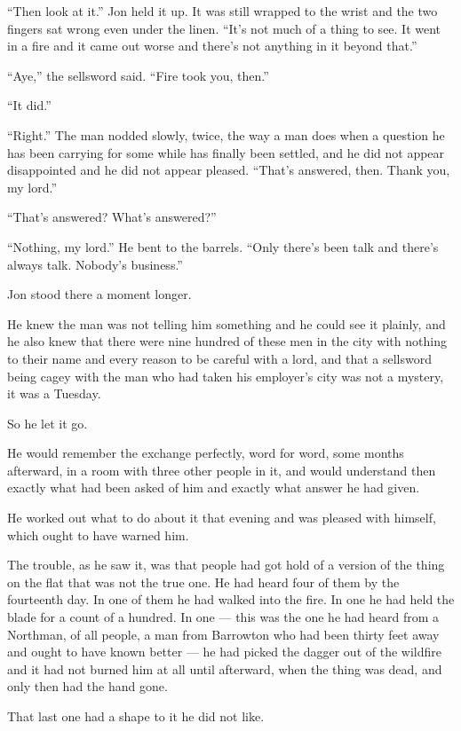 “Then look at it.” Jon held it up. It was still wrapped to the wrist and the two fingers sat wrong even under the linen. “It’s not much of a thing to see. It went in a fire and it came out worse and there’s not anything in it beyond that.”

“Aye,” the sellsword said. “Fire took you, then.”

“It did.”

“Right.” The man nodded slowly, twice, the way a man does when a question he has been carrying for some while has finally been settled, and he did not appear disappointed and he did not appear pleased. “That’s answered, then. Thank you, my lord.”

“That’s answered? What’s answered?”

“Nothing, my lord.” He bent to the barrels. “Only there’s been talk and there’s always talk. Nobody’s business.”

Jon stood there a moment longer.

He knew the man was not telling him something and he could see it plainly, and he also knew that there were nine hundred of these men in the city with nothing to their name and every reason to be careful with a lord, and that a sellsword being cagey with the man who had taken his employer’s city was not a mystery, it was a Tuesday.

So he let it go.

He would remember the exchange perfectly, word for word, some months afterward, in a room with three other people in it, and would understand then exactly what had been asked of him and exactly what answer he had given.

\sceneBreak

He worked out what to do about it that evening and was pleased with himself, which ought to have warned him.

The trouble, as he saw it, was that people had got hold of a version of the thing on the flat that was not the true one. He had heard four of them by the fourteenth day. In one of them he had walked into the fire. In one he had held the blade for a count of a hundred. In one — this was the one he had heard from a Northman, of all people, a man from Barrowton who had been thirty feet away and ought to have known better — he had picked the dagger out of the wildfire and it had not burned him at all until afterward, when the thing was dead, and only then had the hand gone.

That last one had a shape to it he did not like.

